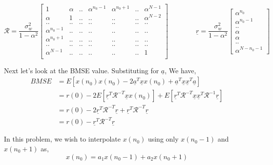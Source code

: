 \documentclass[a4 paper]{article}
\begin{document}
\[
\mathcal{R} = \frac{\sigma_{w}^{2}}{1 - \alpha^{2}}
\begin{bmatrix}
1	& \alpha	& ..	& \alpha^{n_{0}-1}	& \alpha^{n_{0}+1}	& ..	& \alpha^{N-1}	\\
\alpha	& 1	& ..	& ..			& ..			& ..	& \alpha^{N-2}	\\	
..	& ..	& ..	& ..			& ..			& ..	& ..	\\	
\alpha^{n_{0}-1}	& ..	& ..	& ..	& ..			& ..	& ..	\\	
\alpha^{n_{0}+1}	& ..	& ..	& ..	& ..			& ..	& ..	\\	
..	& ..	& ..	& ..			& ..			& ..	& ..	\\	
\alpha^{N-1}	& ..	& ..	& ..		& ..			& ..	& 1	\\	
\end{bmatrix}
\hspace{4em}
\underline{r} = \frac{\sigma_{w}^{2}}{1 - \alpha^{2}}
\begin{bmatrix}
\alpha^{n_{0}}	\\ \alpha^{n_{0}-1}	\\ ..	\\ \alpha	\\ \alpha	\\ ..	\\ \alpha^{N-n_{0} -1} 
\end{bmatrix}
\]


Next let's look at the BMSE value. Substituting for $\underline{a}$, We have,
\begin{align*}
	BMSE &= E[x(n_{0})x(n_{0}) -2 \underline{a}^{T}\underline{x} x(n_{0}) + \underline{a}^{T}\underline{x}\underline{x}^{T}\underline{a}]	\\
		&= r(0) -2 E[\underline{r}^{T} \mathcal{R}^{-T} \underline{x} x(n_{0})] + E[\underline{r}^{T} \mathcal{R}^{-T} \underline{x} \underline{x}^{T} \mathcal{R}^{-1} \underline{r}]	\\
		&= r(0) -2 \underline{r}^{T} \mathcal{R}^{-T} \underline{r} + \underline{r}^{T} \mathcal{R}^{-T} \underline{r}	\\
		&= r(0) - \underline{r}^{T} \mathcal{R}^{-T} \underline{r} 
\end{align*}



\newpage
{}
\solution In this problem, we wish to interpolate $x(n_{0})$ using only $x(n_{0} -1)$ and $x(n_{0} +1)$ as,
\begin{equation*}
	x(n_{0}) = a_{1}x(n_{0}-1) + a_{2}x(n_{0}+1)
\end{equation*}
\end{document}
